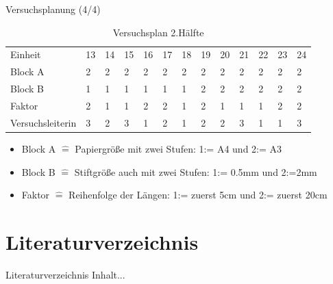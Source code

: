 \documentclass[ ngerman, fontsize= 10pt, headings=big, titlepage=true]{beamer}
\begin{document}
\begin{frame}{Versuchsplanung (4/4)}
	
{\small
\begin{table}[hb]
	\caption{Versuchsplan 2.Hälfte}
	\centering
	\begin{tabular}[b]{l||l|l|l|l|l|l|l|l|l|l|l|l}
		\hline
		Einheit & 13 & 14 & 15 & 16 & 17 & 18 & 19 & 20 & 21 & 22 & 23 & 24\\
		\hhline{=============}
		Block A & 2 & 2 & 2 & 2 & 2 & 2 & 2 & 2 & 2 & 2 & 2 & 2\\
		\hline
		Block B & 1 & 1 & 1 & 1 & 1 & 1 & 2 & 2 & 2 & 2 & 2 & 2\\
		\hline
		Faktor & 2 & 1 & 1 & 2 & 2 & 1 & 2 & 1 & 1 & 1 & 2 & 2\\
		\hhline{=============}
		{\tiny Versuchsleiterin} & 3 & 2 & 3 & 1 & 2 & 1 & 2 & 2 & 3 & 1 & 1 & 3\\
		\hline
	\end{tabular}
\end{table}}

\begin{itemize}
	\item Block A $\hat{=}$ Papiergröße mit zwei Stufen: 1:= A4 und 2:= A3  
	\item Block B $\hat{=}$ Stiftgröße auch mit zwei Stufen:  1:= 0.5mm und 2:=2mm 
	\item Faktor $\hat{=}$ Reihenfolge der Längen: 1:= zuerst 5cm und 2:= zuerst 20cm
\end{itemize}

\end{frame}



\section{Literaturverzeichnis}
\begin{frame}{Literaturverzeichnis}
	Inhalt...
\end{frame}
\end{document}
